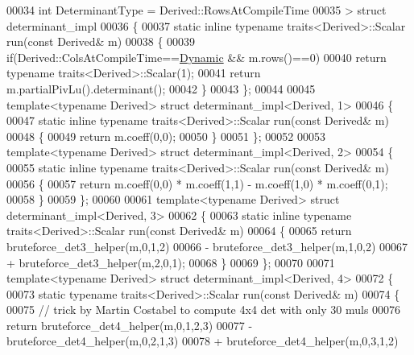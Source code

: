 \begin{DoxyCode}
00034          \textcolor{keywordtype}{int} DeterminantType = Derived::RowsAtCompileTime
00035 > \textcolor{keyword}{struct }determinant\_impl
00036 \{
00037   \textcolor{keyword}{static} \textcolor{keyword}{inline} \textcolor{keyword}{typename} traits<Derived>::Scalar run(\textcolor{keyword}{const} Derived& m)
00038   \{
00039     \textcolor{keywordflow}{if}(Derived::ColsAtCompileTime==\hyperlink{namespace_eigen_ad81fa7195215a0ce30017dfac309f0b2}{Dynamic} && m.rows()==0)
00040       \textcolor{keywordflow}{return} \textcolor{keyword}{typename} traits<Derived>::Scalar(1);
00041     \textcolor{keywordflow}{return} m.partialPivLu().determinant();
00042   \}
00043 \};
00044 
00045 \textcolor{keyword}{template}<\textcolor{keyword}{typename} Derived> \textcolor{keyword}{struct }determinant\_impl<Derived, 1>
00046 \{
00047   \textcolor{keyword}{static} \textcolor{keyword}{inline} \textcolor{keyword}{typename} traits<Derived>::Scalar run(\textcolor{keyword}{const} Derived& m)
00048   \{
00049     \textcolor{keywordflow}{return} m.coeff(0,0);
00050   \}
00051 \};
00052 
00053 \textcolor{keyword}{template}<\textcolor{keyword}{typename} Derived> \textcolor{keyword}{struct }determinant\_impl<Derived, 2>
00054 \{
00055   \textcolor{keyword}{static} \textcolor{keyword}{inline} \textcolor{keyword}{typename} traits<Derived>::Scalar run(\textcolor{keyword}{const} Derived& m)
00056   \{
00057     \textcolor{keywordflow}{return} m.coeff(0,0) * m.coeff(1,1) - m.coeff(1,0) * m.coeff(0,1);
00058   \}
00059 \};
00060 
00061 \textcolor{keyword}{template}<\textcolor{keyword}{typename} Derived> \textcolor{keyword}{struct }determinant\_impl<Derived, 3>
00062 \{
00063   \textcolor{keyword}{static} \textcolor{keyword}{inline} \textcolor{keyword}{typename} traits<Derived>::Scalar run(\textcolor{keyword}{const} Derived& m)
00064   \{
00065     \textcolor{keywordflow}{return} bruteforce\_det3\_helper(m,0,1,2)
00066           - bruteforce\_det3\_helper(m,1,0,2)
00067           + bruteforce\_det3\_helper(m,2,0,1);
00068   \}
00069 \};
00070 
00071 \textcolor{keyword}{template}<\textcolor{keyword}{typename} Derived> \textcolor{keyword}{struct }determinant\_impl<Derived, 4>
00072 \{
00073   \textcolor{keyword}{static} \textcolor{keyword}{typename} traits<Derived>::Scalar run(\textcolor{keyword}{const} Derived& m)
00074   \{
00075     \textcolor{comment}{// trick by Martin Costabel to compute 4x4 det with only 30 muls}
00076     \textcolor{keywordflow}{return} bruteforce\_det4\_helper(m,0,1,2,3)
00077           - bruteforce\_det4\_helper(m,0,2,1,3)
00078           + bruteforce\_det4\_helper(m,0,3,1,2)

\end{DoxyCode}
